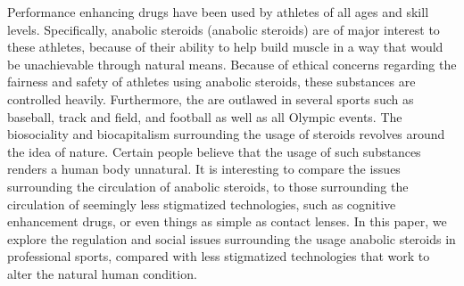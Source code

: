 
%
%
Performance enhancing drugs have been used by athletes of all ages and skill levels.  Specifically, anabolic steroids (anabolic steroids) are of major interest to these athletes, because of their ability to help build muscle in a way that would be unachievable through natural means. Because of ethical concerns regarding the fairness and safety of athletes using anabolic steroids, these substances are controlled heavily. Furthermore, the are outlawed in several sports such as baseball, track and field, and football as well as all Olympic events. The biosociality and biocapitalism surrounding the usage of steroids revolves around the idea of nature. Certain people believe that the usage of such substances renders a human body unnatural. It is interesting to compare the issues surrounding the circulation of anabolic steroids, to those surrounding the circulation of seemingly less stigmatized technologies, such as cognitive enhancement drugs, or even things as simple as contact lenses. In this paper, we explore the regulation and social issues surrounding the usage anabolic steroids in professional sports, compared with less stigmatized technologies that work to alter the natural human condition.  
	
